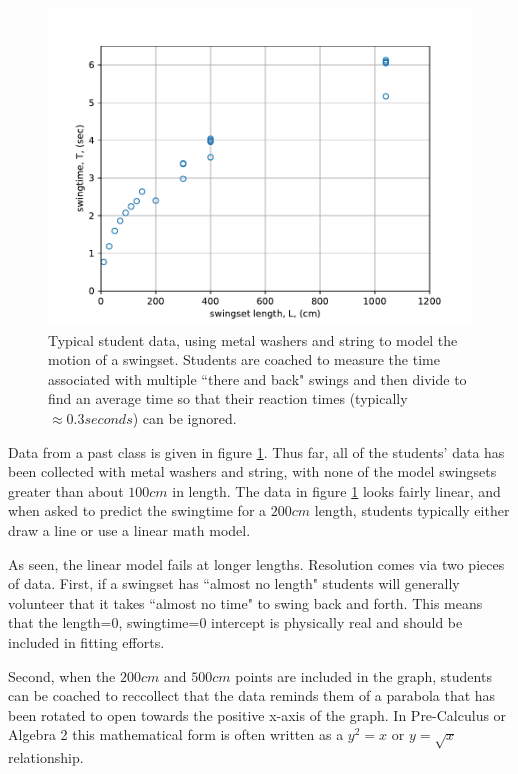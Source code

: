 \documentclass[12pt]{iopart}
\begin{document}
\begin{figure}[h]
\centering
        \includegraphics[width=\columnwidth]{swingtime_graph.pdf}
\caption{
Typical student data, using metal washers and string to model the motion of a swingset.
        Students are coached to measure the time associated with multiple ``there and back" swings and then divide to find an average time so that their reaction times (typically $\approx0.3 seconds$) can be ignored.
        }
        \label{swingtime_graph}
\end{figure}

Data from a past class is given in figure \ref{swingtime_graph}. Thus far, all of the students' data has been collected with metal washers and string, with none of the model swingsets greater than about $100cm$ in length. The data in figure \ref{swingtime_graph} looks fairly linear, and when asked  to predict the swingtime for a $200cm$ length, students typically either draw a line or use a linear math model.  

As seen, the linear model fails at longer lengths. Resolution comes via two pieces of data.  First, if a swingset has ``almost no length" students will generally volunteer that it takes ``almost no time" to swing back and forth.  This means that the length=0, swingtime=0 intercept is physically real and should be included in fitting efforts.  

Second, when the $200cm$ and $500cm$ points are included in the graph, students can be coached to reccollect that the data reminds them of a parabola that has been rotated to open towards the positive x-axis of the graph.  In Pre-Calculus or Algebra 2 this mathematical form is often written as a $y^2=x$ or $y=\sqrt{x}$ relationship.  
\end{document}
